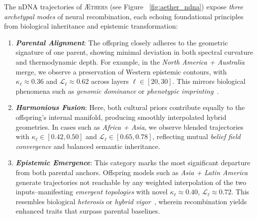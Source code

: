 The nDNA trajectories of \textsc{Æthers} (see Figure ~\ref{fig:aether_ndna}) expose \emph{three archetypal modes} of neural recombination, each echoing foundational principles from biological inheritance and epistemic transformation:

\begin{enumerate}[leftmargin=1.5em]
  \item \textbf{\emph{Parental Alignment}}: The offspring closely adheres to the geometric signature of one parent, showing minimal deviation in both spectral curvature and thermodynamic depth. For example, in the \emph{North America + Australia} merge, we observe a preservation of Western epistemic contours, with \(\kappa_\ell \approx 0.36\) and \(\mathcal{L}_\ell \approx 0.62\) across layers \(\ell \in [20, 30]\). This mirrors biological phenomena such as \emph{genomic dominance} or \emph{phenotypic imprinting}~\citep{bartolomei2011genomic, brockdorff2013xchromosome}.

  \item \textbf{\emph{Harmonious Fusion}}: Here, both cultural priors contribute equally to the offspring's internal manifold, producing smoothly interpolated hybrid geometries. In cases such as \emph{Africa + Asia}, we observe blended trajectories with \(\kappa_\ell \in [0.42, 0.50]\) and \(\mathcal{L}_\ell \in [0.65, 0.78]\), reflecting mutual \emph{belief field convergence} and balanced semantic inheritance.

  \item \textbf{\emph{Epistemic Emergence}}: This category marks the most significant departure from both parental anchors. Offspring models such as \emph{Asia + Latin America} generate trajectories not reachable by any weighted interpolation of the two inputs--manifesting \emph{emergent topologies} with novel \(\kappa_\ell \approx 0.40\), \(\mathcal{L}_\ell \approx 0.72\). This resembles biological \emph{heterosis} or \emph{hybrid vigor}~\citep{gavrilets2003models}, wherein recombination yields enhanced traits that surpass parental baselines.
\end{enumerate}

